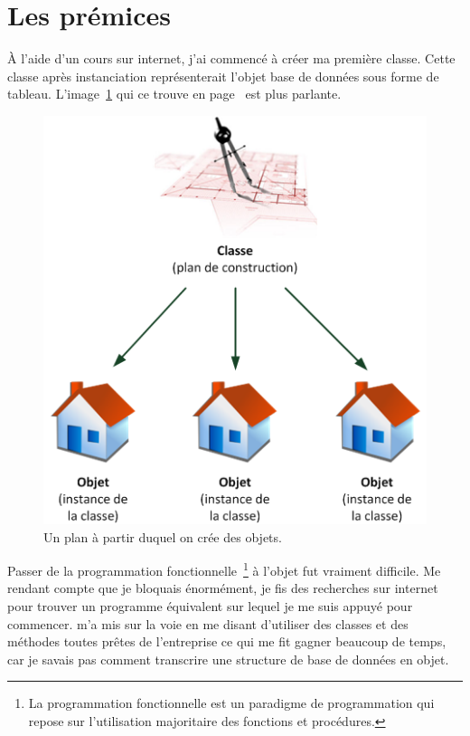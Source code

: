 \section{Les prémices} %
\label{sec:Les prémices}

À l'aide d'un cours sur internet, j'ai commencé à créer ma première
classe.  Cette classe après instanciation représenterait l'objet \og
base de données \fg{} sous forme de tableau. L'image~\ref{obj} qui ce
trouve en page~\pageref{obj} est plus parlante.

\begin{figure}
    \begin{center}
        \includegraphics[scale=0.7]{images/objet.png}
        \caption{Un plan à partir duquel on crée des objets.}
        \label{obj}
    \end{center}
\end{figure}

Passer de la programmation fonctionnelle\, \footnote{La programmation
fonctionnelle est un paradigme de programmation qui repose sur
l'utilisation majoritaire des fonctions et procédures.} à l'objet fut
vraiment difficile. Me rendant compte que je bloquais énormément, je fis
des recherches sur internet pour trouver un programme équivalent sur
lequel je me suis appuyé pour commencer.  m'a mis sur la
voie en me disant d'utiliser des classes et des méthodes toutes prêtes
de l'entreprise ce qui me fit gagner beaucoup de temps, car je savais
pas comment transcrire une structure de base de données en objet.

